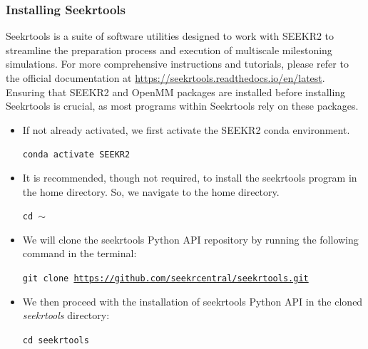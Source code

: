 \documentclass[9pt,training,pubversion]{livecoms}
\newcommand{\seekrtoolslink}{\url{https://seekrtools.readthedocs.io/en/latest}}
\newcommand{\seekrtoolsgithublink}{\url{https://github.com/seekrcentral/seekrtools.git}}
\begin{document}
\subsubsection{Installing Seekrtools}
\vspace{2mm}

\noindent Seekrtools is a suite of software utilities designed to work with SEEKR2 to streamline the preparation process and execution of multiscale milestoning simulations. For more comprehensive instructions and tutorials, please refer to the official documentation at \seekrtoolslink. Ensuring that SEEKR2 and OpenMM packages are installed before installing Seekrtools is crucial, as most programs within Seekrtools rely on these packages. \par

\begin{itemize}

\item If not already activated, we first activate the SEEKR2 conda environment. 

\begin{tcolorbox}[colback=black!8!white, colframe=black!50!black, fontlower=\tiny, left=2pt, right=2pt, top=2pt, bottom=2pt] 
\texttt{conda activate SEEKR2}
\end{tcolorbox}

\item It is recommended, though not required, to install the seekrtools program in the home directory. So, we navigate to the home directory. 

\begin{tcolorbox}[colback=black!8!white, colframe=black!50!black, fontlower=\tiny, left=2pt, right=2pt, top=2pt, bottom=2pt] 
\texttt{cd $\sim$}
\end{tcolorbox}

\item We will clone the seekrtools Python API repository by running the following command in the terminal:

\begin{tcolorbox}[colback=black!8!white, colframe=black!50!black, fontlower=\tiny, left=2pt, right=2pt, top=2pt, bottom=2pt] 
\texttt{git clone \seekrtoolsgithublink}
\end{tcolorbox}

\item We then proceed with the installation of seekrtools Python API in the cloned \textit{seekrtools} directory:

\begin{tcolorbox}[colback=black!8!white, colframe=black!50!black, fontlower=\tiny, left=2pt, right=2pt, top=2pt, bottom=2pt] 
\texttt{cd seekrtools} 
\end{tcolorbox}


\end{itemize}
\end{document}
